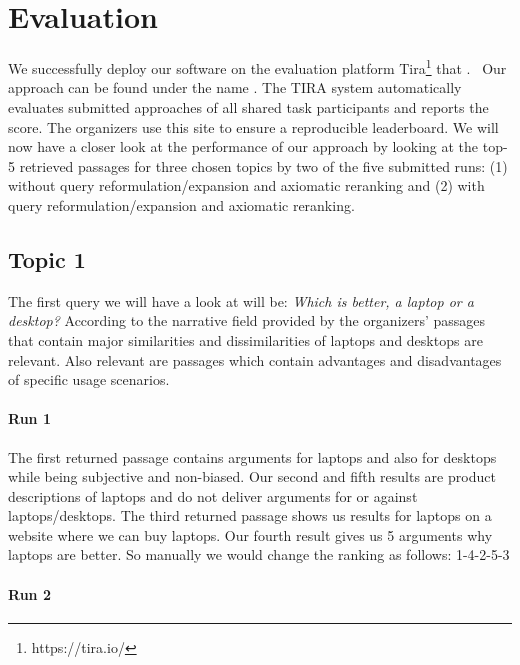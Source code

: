 \section{Evaluation}\label{evaluation}

We successfully deploy our software on the evaluation platform Tira\footnote{https://tira.io/} that .~\todocite
Our approach can be found under the name .
The TIRA system automatically evaluates submitted approaches of all shared task participants and reports the  score.
The organizers use this site to ensure a reproducible leaderboard.
We will now have a closer look at the performance of our approach by looking at the top-5 retrieved passages for three chosen topics by two of the five submitted runs: 
(1) without query reformulation/expansion and axiomatic reranking and
(2) with query reformulation/expansion and axiomatic reranking.

\subsection{Topic 1}

The first query we will have a look at will be: \textit{Which is better, a laptop or a desktop?}
According to the narrative field provided by the organizers' passages that contain major similarities and dissimilarities of laptops and desktops are relevant.
Also relevant are passages which contain advantages and disadvantages of specific usage scenarios.

\paragraph{Run 1}

The first returned passage contains arguments for laptops and also for desktops while being subjective and non-biased.
Our second and fifth results are product descriptions of laptops and do not deliver arguments for or against laptops/desktops.
The third returned passage shows us results for laptops on a website where we can buy laptops.
Our fourth result gives us 5 arguments why laptops are better.
So manually we would  change the ranking as follows: 1-4-2-5-3

\paragraph{Run 2}

